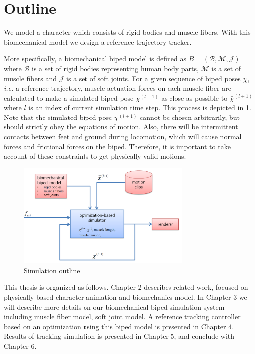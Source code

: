 \documentclass[master,english,final]{kaist-ucs}
\begin{document}
\section{Outline}

We model a character which consists of rigid bodies and muscle fibers.
With this biomechanical model we design a reference trajectory tracker.

More specifically, a biomechanical biped model is defined as $B = (\mathcal{B}, \mathcal{M}, \mathcal {J})$ where
$\mathcal{B}$ is a set of rigid bodies representing human body parts,
$\mathcal{M}$ is a set of muscle fibers and $\mathcal{J}$ is a set of
soft joints. For a given sequence of biped poses $\bar{\chi}$,
\emph{i.e.} a reference trajectory, muscle actuation forces on
each muscle fiber are calculated to make a simulated biped pose
$\chi^{(l+1)}$ as close as possible to
$\bar{\chi}^{(l+1)}$ where $l$ is an index of current simulation time step.
This process is depicted in \ref{overview2}.
Note that the simulated biped pose $\chi^{(l+1)}$ cannot be chosen arbitrarily,
but should strictly obey the equations of motion. Also, there will be intermittent contacts
between feet and ground during locomotion, which will cause normal forces and frictional forces on
the biped. Therefore, it is important to take account of these constraints to get physically-valid
motions.


\begin{figure}[h!]
\label{probdef}
  \centering
  \includegraphics[width=0.75\textwidth]{overview2}
  \caption{Simulation outline}
  \label{overview2}
\end{figure}

This thesis is organized as follows. Chapter 2 describes related work,
focused on physically-based character animation and biomechanics model.
In Chapter 3 we will describe more details on our biomechanical biped simulation system
including muscle fiber model, soft joint model.
A reference tracking controller based on an optimization
using this biped model is presented in Chapter 4.
Results of tracking simulation is presented in Chapter 5,
and conclude with Chapter 6.
\end{document}
